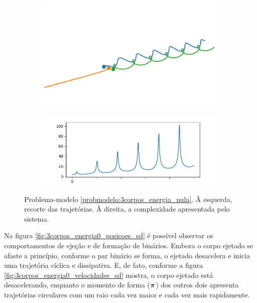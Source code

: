 \begin{figure}[H]
    \centering
    
    \begin{subfigure}{.5\textwidth}
        \centering
        \includegraphics[width=0.8\linewidth]{tcc/img/sd/3corpos_energia0_posicoes_nd_2.png}
        \caption{}
        \label{fig:probmodel_3_corpos_energia0_trajetoria}
    \end{subfigure}%
    \begin{subfigure}{.5\textwidth}
        \centering
        \includegraphics[width=\linewidth]{tcc/img/sd/3corpos_energia0_complexidade.png}
        \caption{}
        \label{fig:3corpos_energia0_complexidade}
    \end{subfigure}

    \caption{Problema-modelo \ref{probmodelo:3corpos_energia_nula}. À esquerda, recorte das trajetórias. À direita, a complexidade apresentada pelo sistema.}
    \label{fig:figuras_probmodel_3_energia0}
\end{figure}

Na figura \ref{fig:3corpos_energia0_posicoes_sd} é possível observar os comportamentos de ejeção e de formação de binários. Embora o corpo ejetado se afaste a princípio, conforme o par binário se forma, o ejetado desacelera e inicia uma trajetória cíclica e dissipativa. E, de fato, conforme a figura \ref{fig:3corpos_energia0_velocidades_sd} mostra, o corpo ejetado está desacelerando, enquanto o momento de forma ($\bm \pi$) dos outros dois apresenta trajetórias circulares com um raio cada vez maior e cada vez mais rapidamente. 

